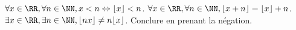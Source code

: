 %
%
	\begin{tasks}
		\task  \Mq  $\forall x \in \RR, \forall n \in \NN, x <n \Leftrightarrow \lfloor x \rfloor < n$.
		\task \Mq $\forall x \in \RR, \forall n \in \NN, \lfloor x + n \rfloor = \lfloor x \rfloor +n$.
		\task \Mq $\exists x \in \RR, \exists n \in \NN, \lfloor nx \rfloor \neq n \lfloor x \rfloor$. Conclure en prenant la négation.
	\end{tasks}
